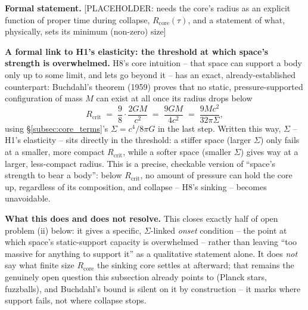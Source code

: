 \documentclass[12pt, a4paper]{article}
\begin{document}
\textbf{Formal statement.}
[PLACEHOLDER: needs the core's radius as an explicit function of
proper time during collapse, $R_{\mathrm{core}}(\tau)$, and a
statement of what, physically, sets its minimum (non-zero) size]

\textbf{A formal link to H1's elasticity: the threshold at which
space's strength is overwhelmed.} H8's core intuition -- that space
can support a body only up to some limit, and lets go beyond it --
has an exact, already-established counterpart: Buchdahl's theorem
(1959) proves that no static, pressure-supported configuration of
mass $M$ can exist at all once its radius drops below
\begin{equation}
R_{\text{crit}} \;=\; \frac{9}{8}\cdot\frac{2GM}{c^2} \;=\; \frac{9GM}{4c^2}
\;=\; \frac{9Mc^2}{32\pi\Sigma},
\end{equation}
using \S\ref{subsec:core_terms}'s $\Sigma=c^4/8\pi G$ in the last
step. Written this way, $\Sigma$ -- H1's elasticity -- sits directly
in the threshold: a stiffer space (larger $\Sigma$) only fails at a
smaller, more compact $R_{\text{crit}}$, while a softer space
(smaller $\Sigma$) gives way at a larger, less-compact radius. This
is a precise, checkable version of ``space's strength to bear a
body'': below $R_{\text{crit}}$, no amount of pressure can hold the
core up, regardless of its composition, and collapse -- H8's
sinking -- becomes unavoidable.

\textbf{What this does and does not resolve.} This closes exactly
half of open problem (ii) below: it gives a specific, $\Sigma$-linked
\emph{onset} condition -- the point at which space's static-support
capacity is overwhelmed -- rather than leaving ``too massive for
anything to support it'' as a qualitative statement alone. It does
\emph{not} say what finite size $R_{\mathrm{core}}$ the sinking core
settles at afterward; that remains the genuinely open question this
subsection already points to (Planck stars, fuzzballs), and
Buchdahl's bound is silent on it by construction -- it marks where
support fails, not where collapse stops.
\end{document}

